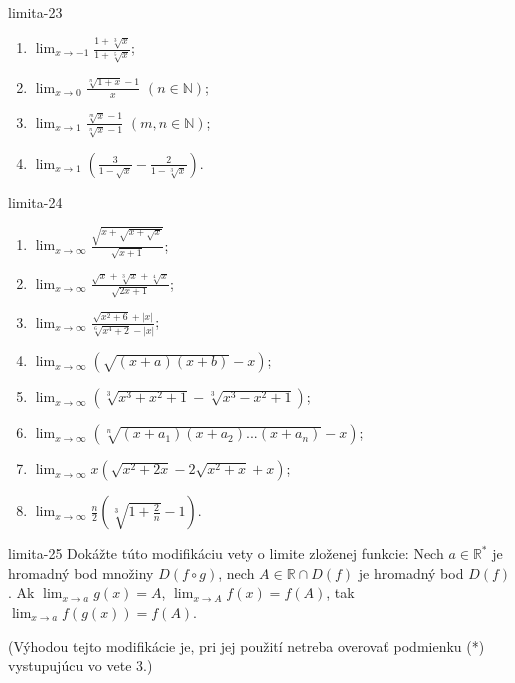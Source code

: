 \begin{defproblem}{limita-23}
\begin{enumerate}
\item $\lim_{x \rightarrow -1} \frac{1+\sqrt[3]{x}}{1+\sqrt[5]{x}}$;
\item $\lim_{x \rightarrow 0} \frac{\sqrt[n]{1+x}-1}{x}$  $(n \in \mathbb{N})$;
\item $\lim_{x \rightarrow 1} \frac{\sqrt[m]{x}-1}{\sqrt[n]{x}-1}$  $(m,n \in \mathbb{N})$;
\item $\lim_{x \rightarrow 1} (\frac{3}{1-\sqrt{x}}-\frac{2}{1-\sqrt[3]{x}})$.
\end{enumerate}
\end{defproblem}

\begin{defproblem}{limita-24}
\begin{multicols}{2}
\begin{enumerate}
    \item $\lim_{{x \rightarrow \infty}} \frac{\sqrt{x+\sqrt{x+\sqrt{x}}}}{\sqrt{x+1}}$;
    \item $\lim_{{x \rightarrow \infty}} \frac{\sqrt{x}+\sqrt[3]{x}+\sqrt[4]{x}}{\sqrt{2x+1}}$;
    \item $\lim_{{x \rightarrow \infty}} \frac{\sqrt{x^2+6}+|x|}{\sqrt[6]{x^4+2}-|x|}$;
    \item $\lim_{{x \rightarrow \infty}} (\sqrt{(x+a)(x+b)}-x)$;
    \item $\lim_{{x \rightarrow \infty}} (\sqrt[3]{x^3+x^2+1}-\sqrt[3]{x^3-x^2+1})$;
    \item $\lim_{{x \rightarrow \infty}} (\sqrt[n]{(x+a_1)(x+a_2)...(x+a_n)}-x)$;
    \item $\lim_{{x \rightarrow \infty}} x(\sqrt{x^2+2x}-2\sqrt{x^2+x}+x)$;
    \item $\lim_{{x \rightarrow \infty}} \frac{n}{2}(\sqrt[3]{1+\frac{2}{n}}-1)$.
\end{enumerate}
\end{multicols}
\end{defproblem}

\begin{defproblem}{limita-25}
Dokážte túto modifikáciu vety o limite zloženej funkcie: Nech $a \in \mathbb{R^*}$ je hromadný bod množiny $D(f \circ g)$, nech $A \in \mathbb{R}\cap D(f)$ je hromadný bod $D(f)$. Ak $\lim_{x \rightarrow a} g(x)=A$, $\lim_{x \rightarrow A} f(x)=f(A)$, tak $\lim_{x \rightarrow a} f(g(x))=f(A)$.

(Výhodou tejto modifikácie je, pri jej použití netreba overovať podmienku (*) vystupujúcu vo vete $3$.)
\end{defproblem}

